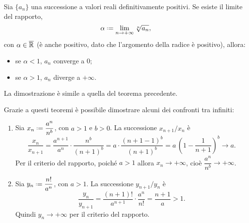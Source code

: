 \begin{teorema}
\label{t:criterio_della_radice_successioni}
Sia $\{a_n\}$ una successione a valori reali definitivamente positivi. Se esiste il limite del rapporto,
\[
\alpha\defeq\lim_{n\to +\infty} \sqrt[n]{a_n},
\]
con $\alpha\in\overline{\mathbb{R}}$ (è anche positivo, dato che l'argomento della radice è positivo), allora:
\begin{itemize}
	\item se $\alpha<1$, $a_n$ converge a 0;
	\item se $\alpha>1$, $a_n$ diverge a $+\infty$.
\end{itemize}
\end{teorema}
La dimostrazione è simile a quella del teorema precedente.

Grazie a questi teoremi è possibile dimostrare alcuni dei confronti tra infiniti:
\begin{enumerate}
\item Sia $x_n\defeq\dfrac{a^n}{n^b}$, con $a>1$ e $b>0$. La successione $x_{n+1}/x_n$ è
\[
\frac{x_n}{x_{n+1}}=\frac{a^{n+1}}{a^n}\cdot\frac{n^b}{(n+1)^b}=a\cdot\frac{(n+1-1)^b}{(n+1)^b}=a\,\left(1-\frac{1}{n+1}\right)^b\to a.
\]
Per il criterio del rapporto, poiché $a>1$ allora $x_n\to +\infty$, cioè $\dfrac{a^n}{n^b}\to +\infty$.
\item Sia $y_n\defeq\dfrac{n!}{a^n}$, con $a>1$. La successione $y_{n+1}/y_n$ è
\[
\frac{y_n}{y_{n+1}}=\frac{(n+1)!}{a^{n+1}}\cdot\frac{a^n}{n!}=\frac{n+1}{a}>1.
\]
Quindi $y_n\to +\infty$ per il criterio del rapporto.
\end{enumerate}


